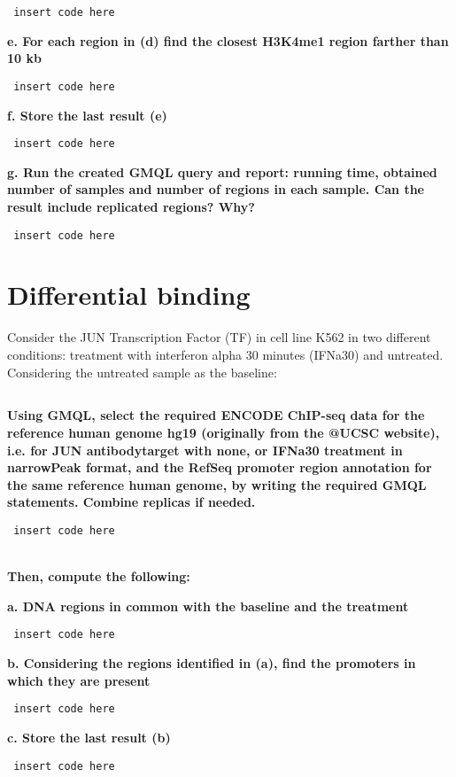 \documentclass[12pt, a4paper]{article}
\begin{document}
\begin{verbatim} insert code here \end{verbatim} 

\textbf{e. For each region in (d) find the closest H3K4me1 region farther than 10 kb}

\begin{verbatim} insert code here \end{verbatim} 

\textbf{f. Store the last result (e)}

\begin{verbatim} insert code here \end{verbatim} 

\textbf{g. Run the created GMQL query and report: running time, obtained number of samples and number of regions in each sample. Can the result include replicated regions? Why?}

\begin{verbatim} insert code here \end{verbatim} 

\section{Differential binding}

Consider the JUN Transcription Factor (TF) in cell line K562 in two different conditions: treatment with interferon alpha 30 minutes (IFNa30) and untreated.
Considering the untreated sample as the baseline:

\subsection{}
\textbf{Using GMQL, select the required ENCODE ChIP-seq data for the reference human genome hg19 (originally from the @UCSC website), i.e. for JUN antibody\textunderscore target with none, or IFNa30 treatment in narrowPeak format, and the RefSeq promoter region annotation for the same reference human genome, by writing the required GMQL statements. Combine replicas if needed. }

\begin{verbatim} insert code here \end{verbatim}

\textbf{\\ Then, compute the following:}


\textbf{a. DNA regions in common with the baseline and the treatment}

\begin{verbatim} insert code here \end{verbatim}

\textbf{b. Considering the regions identified in (a), find the promoters in which they are present}

\begin{verbatim} insert code here \end{verbatim}

\textbf{c. Store the last result (b)}

\begin{verbatim} insert code here \end{verbatim}
\end{document}
